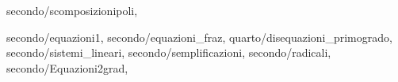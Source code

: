 secondo/scomposizionipoli,

    secondo/equazioni1,
  secondo/equazioni_fraz,
  quarto/disequazioni_primogrado,
 secondo/sistemi_lineari,
	secondo/semplificazioni,
	secondo/radicali,
	secondo/Equazioni2grad,